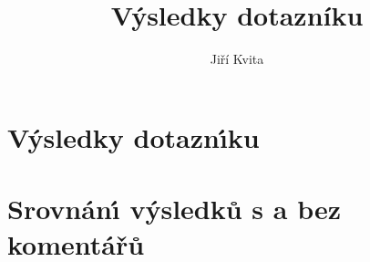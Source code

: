 \documentclass[a4paper,twoside]{article}
\author{Jiří Kvita}
\title{Výsledky dotazníku}
\begin{document}
\tableofcontents

\section{V\'{y}sledky dotazn\'{\i}ku}





\newpage
\section{Srovn\'{a}n\'{\i} v\'{y}sledk\r{u} s a bez koment\'{a}\v{r}\r{u}}





\end{document}
